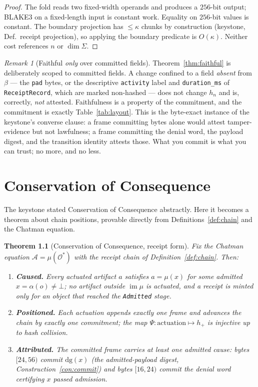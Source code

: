 \documentclass[11pt,oneside]{book}
\theoremstyle{definition}
\theoremstyle{plain}
\newtheorem{theorem}{Theorem}[chapter]
\theoremstyle{remark}
\newtheorem*{remark}{Remark}
\newcommand{\Adm}{\mathcal{O}^{*}}             %
\newcommand{\Act}{\mathcal{A}}                 %
\newcommand{\muop}{\mu}                        %
\newcommand{\adm}{\alpha}                      %
\newcommand{\Rfsl}{\bot}                        %
\newcommand{\CL}{\kappa}                       %
\newcommand{\dg}{\mathrm{dg}}                   %
\DeclareMathOperator{\im}{im}
\newcommand{\body}{\beta}                       %
\newcommand{\code}[1]{\texttt{#1}}
\newcommand{\Sig}{\Sigma}                       %
\begin{document}
\begin{proof}
The fold reads two fixed-width operands and produces a $256$-bit output; BLAKE3 on a fixed-length input is constant work. %
Equality on $256$-bit values is constant. %
The boundary projection has $\le\CL$ chunks by construction (keystone, Def.\ receipt projection), so applying the boundary predicate is $O(\CL)$. %
Neither cost references $n$ or $\dim\Sig$. %
\end{proof}

\begin{remark}[Faithful \emph{only} over committed fields]
Theorem~\ref{thm:faithful} is deliberately scoped to committed fields. %
A change confined to a field \emph{absent} from $\body$ --- the \code{pad} bytes, or the descriptive \code{activity} label and \code{duration\_ms} of \code{ReceiptRecord}, which are marked non-hashed --- does not change $h_n$ and is, correctly, \emph{not} attested. %
Faithfulness is a property of the commitment, and the commitment is exactly Table~\ref{tab:layout}. %
This is the byte-exact instance of the keystone's converse clause: a frame committing bytes alone would attest tamper-evidence but not lawfulness; a frame committing the denial word, the payload digest, and the transition identity attests those. %
What you commit is what you can trust; no more, and no less. %
\end{remark}

\chapter{Conservation of Consequence}
\label{ch:conservation}

The keystone stated Conservation of Consequence abstractly. %
Here it becomes a theorem about chain positions, provable directly from Definitions~\ref{def:chain} and the Chatman equation. %

\begin{theorem}[Conservation of Consequence, receipt form]\label{thm:conservation}
Fix the Chatman equation $\Act=\muop(\Adm)$ with the receipt chain of Definition~\ref{def:chain}. %
Then: %
\begin{enumerate}[label=(\roman*),leftmargin=*]
\item \textbf{Caused.} Every actuated artifact $a$ satisfies $a=\muop(x)$ for some admitted
$x=\adm(o)\ne\Rfsl$; no artifact outside $\im\muop$ is actuated, and a receipt is minted only for an object that reached the \code{Admitted} stage. %
\item \textbf{Positioned.} Each actuation appends \emph{exactly one} frame and advances the
chain by \emph{exactly one} commitment; the map $\Psi:\text{actuation}\mapsto h_{+}$ is injective up to hash collision. %
\item \textbf{Attributed.} The committed frame carries at least one admitted cause: bytes
$[24,56)$ commit $\dg(x)$ (the admitted-payload digest, Construction~\ref{con:commit}) and bytes $[16,24)$ commit the denial word certifying $x$ passed admission. %
\end{enumerate}
\end{theorem}
\end{document}
